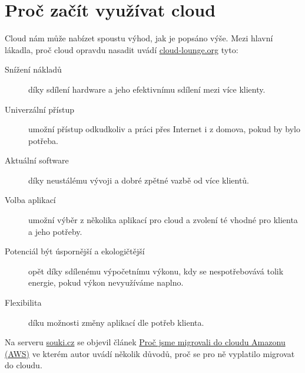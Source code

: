 \section{Proč začít využívat cloud}
Cloud nám může nabízet spoustu výhod, jak je popsáno výše. Mezi hlavní lákadla, proč cloud opravdu nasadit uvádí \href{http://www.cloud-lounge.org/why-use-clouds.html}{cloud-lounge.org}\cite{cloudlounge:ProcCloud} tyto:
\begin{description}
	\item [Snížení nákladů] díky sdílení hardware a jeho efektivnímu sdílení mezi více klienty.
	\item [Univerzální přístup] umožní přístup odkudkoliv a práci přes Internet i z domova, pokud by bylo potřeba.
	\item [Aktuální software] díky neustálému vývoji a dobré zpětné vazbě od více klientů.
	\item [Volba aplikací] umožní výběr z několika aplikací pro cloud a zvolení té vhodné pro klienta a jeho potřeby.
	\item [Potenciál být úspornější a ekologičtější] opět díky sdílenému výpočetnímu výkonu, kdy se nespotřebovává tolik energie, pokud výkon nevyužíváme naplno.
	\item [Flexibilita] díku možnosti změny aplikací dle potřeb klienta.
\end{description}
Na serveru \href{http://souki.cz}{souki.cz} se objevil článek \href{http://www.souki.cz/proc-jsme-migrovali-do-cloudu-amazonu-aws}{Proč jsme migrovali do cloudu Amazonu (AWS)\cite{souki:procMigrovat}} ve kterém autor uvádí několik důvodů, proč se pro ně vyplatilo migrovat do cloudu.

